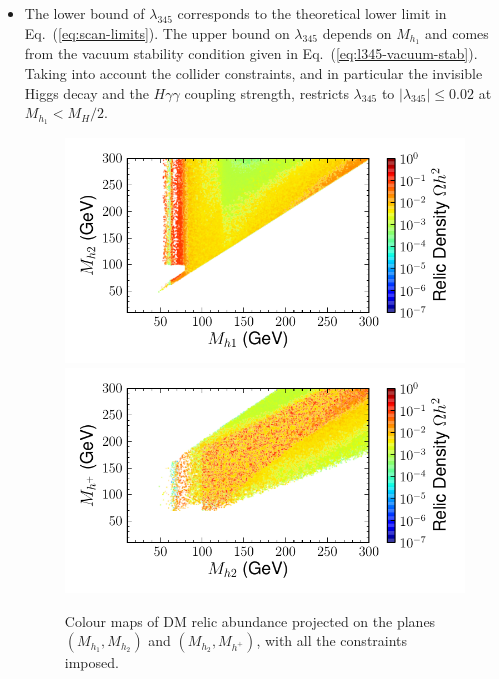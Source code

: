 \documentclass[12pt,a4paper]{article}
\begin{document}
\begin{itemize}

\item The lower bound of $\lambda_{345}$ corresponds to the theoretical lower limit in Eq.~(\ref{eq:scan-limits}).
The upper bound on $\lambda_{345}$ depends on $M_{h_1}$ and comes from 
the vacuum stability condition given in Eq.~(\ref{eq:l345-vacuum-stab}). 
Taking into account the collider constraints, and in particular the invisible Higgs decay
and the $H\gamma\gamma$ coupling strength, restricts $\lambda_{345}$
to $|\lambda_{345}|\leq 0.02$ at $M_{h_1}<M_H/2$.

\begin{figure}[tbh]
\begin{center}
\includegraphics[trim={0.3cm 0  2.6cm 0.5cm},clip,height=0.26\textheight]{Mh1_Mh2_Omega_small_new-cut12345678_z.pdf}%
\includegraphics[trim={0.3cm 0   0    0.5cm },clip,height=0.26\textheight]{Mhc_Mh2_Omega_small_new-cut12345678_z.pdf}
\caption{Colour maps of DM relic abundance projected on the planes $(M_{h_1}, M_{h_2})$ and $(M_{h_2}, M_{h^+})$, with all the constraints imposed.\label{fig:scan-masses}} 
\end{center}
\end{figure}




\end{itemize}
\end{document}
